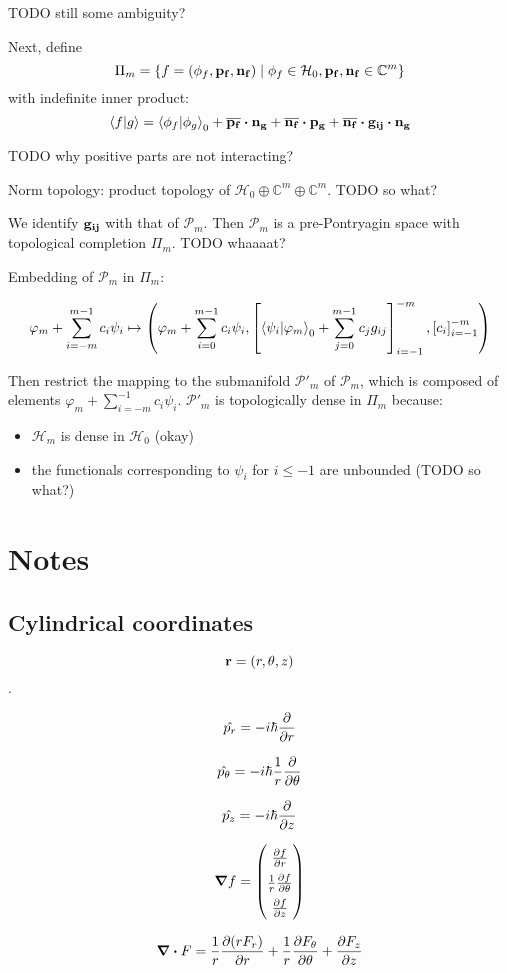 \documentclass[12pt, a4paper]{article}
\newcommand{\hilb}[1]{\mathcal{H}_{#1}}
\newcommand{\cconj}[1]{\overline{#1}}
\begin{document}
TODO still some ambiguity?

Next, define 
\[
\Pi_m = \{f = (\phi_f, \vb{p_f}, \vb{n_f}) \mid \phi_f \in \hilb{0}, \vb{p_f}, \vb{n_f} \in \mathbb{C}^m \}
\]
with indefinite inner product:
\[
\ip{f}{g} =
\ip{\phi_f}{\phi_g}_0 +
\cconj{\vb{p_f}} \vdot \vb{n_g} +
\cconj{\vb{n_f}} \vdot \vb{p_g} + 
\cconj{\vb{n_f}} \vdot \vb{g_{ij}} \vdot \vb{n_g}
\]

TODO why positive parts are not interacting?

Norm topology: product topology of $\hilb{0} \oplus \mathbb{C}^m \oplus \mathbb{C}^m$. TODO so what?

We identify $\vb{g_{ij}}$ with that of $\mathcal{P}_m$. Then $\mathcal{P}_m$ is a pre-Pontryagin space with topological completion $\Pi_m$. TODO whaaaat?

Embedding of $\mathcal{P}_m$ in $\Pi_m$:

\[
\varphi_m + \sum\limits_{i = -m}^{m - 1} c_i \psi_i \mapsto
\left(
\varphi_m + \sum\limits_{i = 0}^{m - 1} c_i \psi_i,
\left[ \ip{\psi_i}{\varphi_m}_0 + \sum\limits_{j = 0}^{m - 1} c_j g_{ij} \right]_{i = -1}^{-m},
\left[ c_i \right]_{i = -1}^{-m}
\right)
\]

Then restrict the mapping to the submanifold $\mathcal{P}'_m$ of $\mathcal{P}_m$, which is composed of elements $\varphi_m + \sum\limits_{i = - m}^{-1} c_i \psi_i$. $\mathcal{P}'_m$ is topologically dense in $\Pi_m$ because:

\begin{itemize}
\item $\hilb{m}$ is dense in $\hilb{0}$ (okay)
\item the functionals corresponding to $\psi_i$ for $i \le -1$ are unbounded (TODO so what?)
\end{itemize}

\section{Notes}
\subsection{Cylindrical coordinates}
$$\vb{r} = (r, \theta, z)$$. 


$$\hat {p_r} = - i \hbar \pdv{r}$$

$$\hat{p_\theta} = - i \hbar \frac{1}{r} \pdv{\theta}$$

$$\hat{p_z} = - i \hbar \pdv{z}$$

$$\renewcommand\arraystretch{1.5}
\gradient f = 
\begin{pmatrix}
\pdv{f}{r} \\
\frac{1}{r} \pdv{f}{\theta}  \\
\pdv{f}{z} 
\end{pmatrix}
$$


$$
\divergence F =
\frac{1}{r} \pdv{(r F_r)}{r}
+ \frac{1}{r} \pdv{F_\theta}{\theta}
+ \pdv{F_z}{z}
$$
\end{document}
